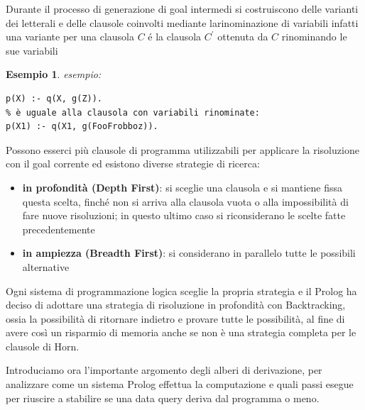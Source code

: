 \documentclass[a4paper]{report}
\newtheorem{esempio}{Esempio}
\begin{document}
\begin{itemize}
Durante il processo di generazione di goal intermedi si costruiscono delle varianti dei letterali e delle clausole coinvolti
mediante larinominazione di variabili infatti una variante per una clausola $C$ é la clausola $C^{'}$ ottenuta da $C$ rinominando le sue variabili
\begin{esempio}
esempio:
\begin{verbatim}
p(X) :- q(X, g(Z)).
% è uguale alla clausola con variabili rinominate:
p(X1) :- q(X1, g(FooFrobboz)).
\end{verbatim}
\end{esempio}
Possono esserci più clausole di programma utilizzabili per applicare la risoluzione con il goal corrente ed esistono diverse strategie di ricerca:
\begin{itemize}
\item \textbf{in profondità (Depth First)}: si sceglie una clausola e si mantiene fissa questa scelta, finché non si arriva alla clausola vuota o alla impossibilità di fare nuove risoluzioni; in questo ultimo caso si riconsiderano le scelte fatte precedentemente
\item \textbf{in ampiezza (Breadth First)}: si considerano in parallelo tutte le possibili alternative
\end{itemize}
Ogni sistema di programmazione logica sceglie la propria strategia e il Prolog ha deciso di adottare una strategia di risoluzione
in profondità con Backtracking, ossia la possibilità di ritornare indietro e provare tutte le possibilità, al fine di avere così
un risparmio di memoria anche se non è una strategia completa per le clausole di Horn.

Introduciamo ora l'importante argomento degli alberi di derivazione, per analizzare come un sistema Prolog effettua la computazione
e quali passi esegue per riuscire a stabilire se una data query deriva dal programma o meno.


\end{itemize}
\end{document}
